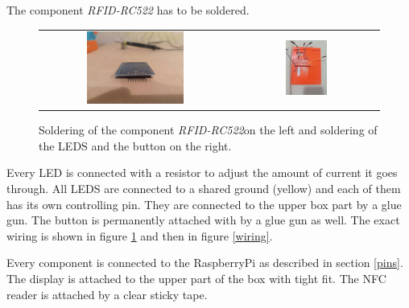 \documentclass{article}
\begin{document}
    The component \emph{RFID-RC522} has to be soldered. 
\begin{figure}[ht]
    \centering
    \begin{tabular}{cc}
        \label{soldering}
        \includegraphics[width=0.53\textwidth]{imgs/Soldering1.jpg}
        &
        \includegraphics[width=0.3\textwidth]{imgs/Soldering2.jpg}
    \end{tabular}
    \caption{Soldering of the component \emph{RFID-RC522}on the left and soldering of the LEDS and the button on the right.}
\end{figure}

    Every LED is connected with a resistor to adjust the amount of current it goes through. 
    All LEDS are connected to a shared ground (yellow) and each of them has its own controlling pin.
    They are connected to the upper box part by a glue gun.
    The button is permanently attached with by a glue gun as well.
    The exact wiring is shown in figure \ref{soldering} and then in figure \ref{wiring}.

    Every component is connected to the RaspberryPi as described in section \ref{pins}. 
    The display is attached to the upper part of the box with tight fit.
    The NFC reader is attached by a clear sticky tape.
\end{document}
